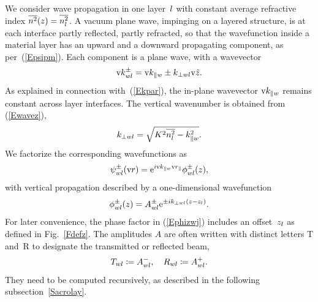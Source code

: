 We consider wave propagation in one layer~$l$
%
with constant average refractive index $\overline{n^2}(z)=\overline{n_l^2}$.
A vacuum plane wave, impinging on a layered structure,
is at each interface partly reflected, partly refracted,
so that the wavefunction inside a material layer
has an upward and a downward propagating component,
as per~(\ref{Epsipm}).
Each component is a plane wave,
with a wavevector
\begin{equation}\label{Ekpmwj3}
  \text{v}{k}^\pm_{wl}= \text{v}{k}_{\parallel w} \pm k_{\perp wl}\text{v}{\hat z}.
\end{equation}
%
%
As explained in connection with~(\ref{Ekpar}),
the in-plane wavevector $\text{v}{k}_{\parallel w}$ remains constant
across layer interfaces.
The vertical wavenumber is obtained from (\ref{Ewavez}),
\begin{equation}\label{Ekperpwj}
  k_{\perp wl} = \sqrt{K^2 \overline{n_l^2} - k_{\parallel w}^2}.
\end{equation}
We factorize the corresponding wavefunctions as
\begin{equation}
  \psi^\pm_{wl}(\text{v}{r})=\text{e}^{i\text{v}{k}_{\parallel w}\text{v}{r}_\parallel}\phi^\pm_{wl}(z),
\end{equation}
with vertical propagation described by a one-dimensional wavefunction
\begin{equation}\label{Ephizwj}
  \phi^\pm_{wl}(z)=A^\pm_{wl}\text{e}^{\pm ik_{\perp wl}(z-z_l)}.
\end{equation}
%
For later convenience,
the phase factor in (\ref{Ephizwj}) includes an offset~$z_l$
as defined in Fig.~\ref{Fdefz}.
%
%
%
The amplitudes $A$ are often written with distinct letters
T and~R to designate the transmitted or reflected beam,
\begin{equation}
  T_{wl} \coloneqq  A^-_{wl},\quad
  R_{wl} \coloneqq  A^+_{wl}.
\end{equation}
%
%
They need to be computed recursively,
as described in the following subsection~\ref{Sacrolay}.

